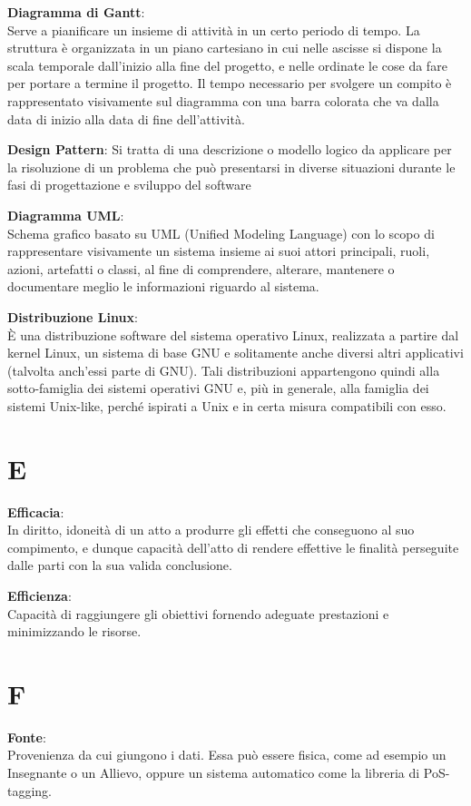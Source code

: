\documentclass[a4paper, oneside, openany, dvipsnames, table]{article}
\begin{document}
\textbf{Diagramma di Gantt}:\\	Serve a pianificare un insieme di attività in un certo periodo di tempo. La struttura è organizzata in un piano cartesiano in cui nelle ascisse si dispone la scala temporale dall’inizio alla fine del progetto, e nelle ordinate le cose da fare per portare a termine il progetto. Il tempo necessario per svolgere un compito è rappresentato visivamente sul diagramma con una barra colorata che va dalla data di inizio alla data di fine dell’attività.

\textbf{Design Pattern}: 
Si tratta di una descrizione o modello logico da applicare per la risoluzione di un problema che può presentarsi in diverse situazioni durante le fasi di progettazione e sviluppo del software

\textbf{Diagramma UML}:\\ Schema grafico basato su UML (Unified Modeling Language) con lo scopo di rappresentare visivamente un sistema insieme ai suoi attori principali, ruoli, azioni, artefatti o classi, al fine di comprendere, alterare, mantenere o documentare meglio le informazioni riguardo al sistema.

\textbf{Distribuzione Linux}:\\	È una distribuzione software del sistema operativo Linux, realizzata a partire dal kernel Linux, un sistema di base GNU e solitamente anche diversi altri applicativi (talvolta anch'essi parte di GNU). Tali distribuzioni appartengono quindi alla sotto-famiglia dei sistemi operativi GNU e, più in generale, alla famiglia dei sistemi Unix-like, perché ispirati a Unix e in certa misura compatibili con esso.


\newpage
\section{E}
\textbf{Efficacia}:\\ In diritto, idoneità di un atto a produrre gli effetti che conseguono al suo compimento, e dunque capacità dell'atto di rendere effettive le finalità perseguite dalle parti con la sua valida conclusione. 

\textbf{Efficienza}:\\ Capacità di raggiungere gli obiettivi fornendo adeguate prestazioni e minimizzando le risorse.

\newpage
\section{F}
\textbf{Fonte}:\\ Provenienza da cui giungono i dati. Essa può essere fisica, come ad esempio un Insegnante o un Allievo, oppure un sistema automatico come la libreria di PoS-tagging.
\end{document}
